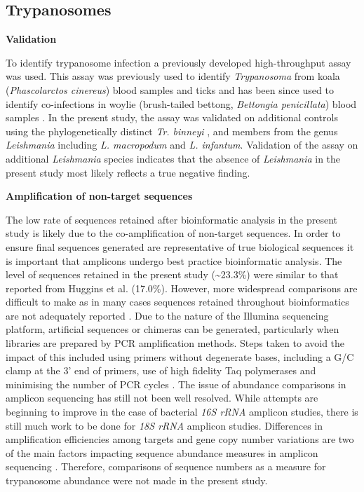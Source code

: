 \documentclass[a4paper, nobind]{templates/ociamthesis}
\begin{document}
\hypertarget{trypanosomes-2}{%
\subsection{Trypanosomes}\label{trypanosomes-2}}

\textbf{Validation}

To identify trypanosome infection a previously developed high-throughput assay was used. This assay was previously used to identify \emph{Trypanosoma} from koala (\emph{Phascolarctos cinereus}) blood samples and ticks \autocite{barbosaIncreasedGeneticDiversity2017} and has been since used to identify co-infections in woylie (brush-tailed bettong, \emph{Bettongia penicillata}) blood samples \autocite{cooperNextGenerationSequencing2018}.
In the present study, the assay was validated on additional controls using the phylogenetically distinct \emph{Tr. binneyi} \autocite{papariniNovelGenotypesTrypanosoma2014}, and members from the genus \emph{Leishmania} including \emph{L. macropodum} and \emph{L. infantum}.
Validation of the assay on additional \emph{Leishmania} species indicates that the absence of \emph{Leishmania} in the present study most likely reflects a true negative finding.

\textbf{Amplification of non-target sequences}

The low rate of sequences retained after bioinformatic analysis in the present study is likely due to the co-amplification of non-target sequences.
In order to ensure final sequences generated are representative of true biological sequences it is important that amplicons undergo best practice bioinformatic analysis.
The level of sequences retained in the present study (\textasciitilde23.3\%) were similar to that reported from Huggins et al. \autocite*{hugginsNovelMetabarcodingDiagnostic2019} (17.0\%).
However, more widespread comparisons are difficult to make as in many cases sequences retained throughout bioinformatics are not adequately reported \autocite{squarreDiversityTrypanosomesWildlife2020,wahabNovelMetabarcoded18S2020}.
Due to the nature of the Illumina sequencing platform, artificial sequences or chimeras can be generated, particularly when libraries are prepared by PCR amplification methods.
Steps taken to avoid the impact of this included using primers without degenerate bases, including a G/C clamp at the 3' end of primers, use of high fidelity Taq polymerases and minimising the number of PCR cycles \autocite{bradleyDesignEvaluationIllumina2016}.
The issue of abundance comparisons in amplicon sequencing has still not been well resolved. While attempts are beginning to improve in the case of bacterial \emph{16S rRNA} amplicon studies, there is still much work to be done for \emph{18S rRNA} amplicon studies.
Differences in amplification efficiencies among targets and gene copy number variations are two of the main factors impacting sequence abundance measures in amplicon sequencing \autocite{bradleyDesignEvaluationIllumina2016}.
Therefore, comparisons of sequence numbers as a measure for trypanosome abundance were not made in the present study.
\end{document}
